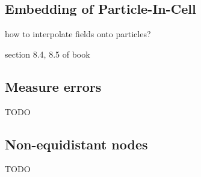 \subsection{Embedding of Particle-In-Cell}

how to interpolate fields onto particles?

section 8.4, 8.5 of book

\subsection{Measure errors}

TODO

\subsection{Non-equidistant nodes \label{ss:fdm_stokes_hvar}}

TODO

























